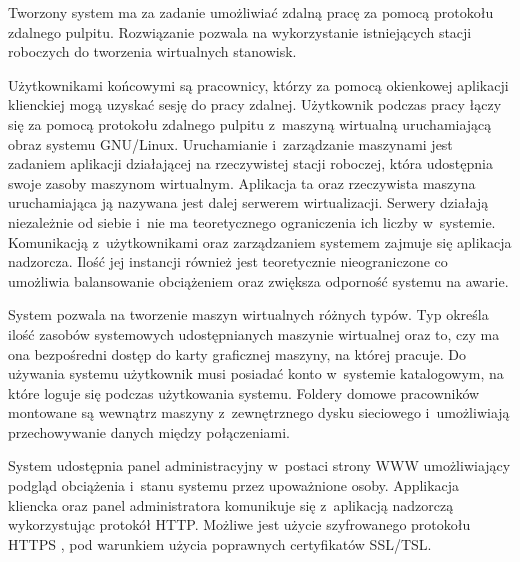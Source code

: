 \documentclass[../wstep.tex]{subfiles}
\begin{document}
Tworzony system ma za zadanie umożliwiać zdalną pracę za pomocą protokołu zdalnego pulpitu. Rozwiązanie pozwala na wykorzystanie istniejących stacji roboczych do tworzenia wirtualnych stanowisk.

Użytkownikami końcowymi są pracownicy, którzy za pomocą okienkowej aplikacji klienckiej mogą uzyskać sesję do pracy zdalnej. Użytkownik podczas pracy łączy się za pomocą protokołu zdalnego pulpitu z~maszyną wirtualną uruchamiającą obraz systemu GNU/Linux. Uruchamianie i~zarządzanie maszynami jest zadaniem aplikacji działającej na rzeczywistej stacji roboczej, która udostępnia swoje zasoby maszynom wirtualnym. Aplikacja ta oraz rzeczywista maszyna uruchamiająca ją nazywana jest dalej serwerem wirtualizacji. Serwery działają niezależnie od siebie i~nie ma teoretycznego ograniczenia ich liczby w~systemie. Komunikacją z~użytkownikami oraz zarządzaniem systemem zajmuje się aplikacja nadzorcza. Ilość jej instancji również jest teoretycznie nieograniczone co umożliwia balansowanie obciążeniem oraz zwiększa odporność systemu na awarie.

System pozwala na tworzenie maszyn wirtualnych różnych typów. Typ określa ilość zasobów systemowych udostępnianych maszynie wirtualnej oraz to, czy ma ona bezpośredni dostęp do karty graficznej maszyny, na której pracuje. Do używania systemu użytkownik musi posiadać konto w~systemie katalogowym, na które loguje się podczas użytkowania systemu. Foldery domowe pracowników montowane są wewnątrz maszyny z~zewnętrznego dysku sieciowego i~umożliwiają przechowywanie danych między połączeniami.

System udostępnia panel administracyjny w~postaci strony WWW umożliwiający podgląd obciążenia i~stanu systemu przez upoważnione osoby. Applikacja kliencka oraz panel administratora komunikuje się z~aplikacją nadzorczą wykorzystując protokół HTTP. Możliwe jest użycie szyfrowanego protokołu HTTPS \parencite{rfc2818}, pod warunkiem użycia poprawnych certyfikatów SSL/TSL.
\end{document}
